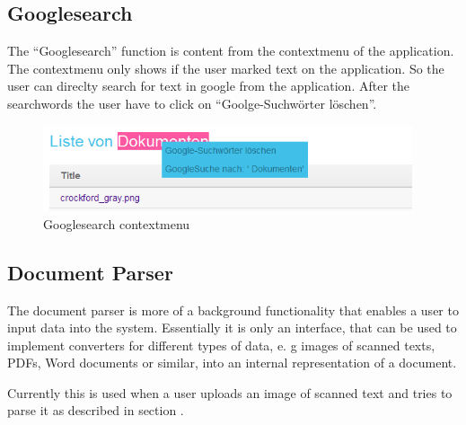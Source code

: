 \subsection{Googlesearch}

The \enquote{Googlesearch} function is content from the contextmenu of the application. The contextmenu only shows if 
the user marked text on the application. So the user can direclty search for text in google from the application. After 
the searchwords the user have to click on \enquote{Goolge-Suchwörter löschen}.

\begin{figure}[!ht]
  \centering
    \includegraphics[width=0.97\textwidth]{images/basic_functionalities/contextmenu_googlesearch.png}
  \caption{Googlesearch contextmenu}
  \label{fig:contextmenu}
\end{figure}

\subsection{Document Parser}

The document parser is more of a background functionality that enables a user to input data into the system. 
Essentially it is only an interface, that can be used to implement converters for different types of data, e. g images 
of scanned texts, PDFs, Word documents 
or similar, into an internal representation of a 
document.  

Currently this is used when a user uploads an image of scanned text and tries to parse it as described in section 
.

